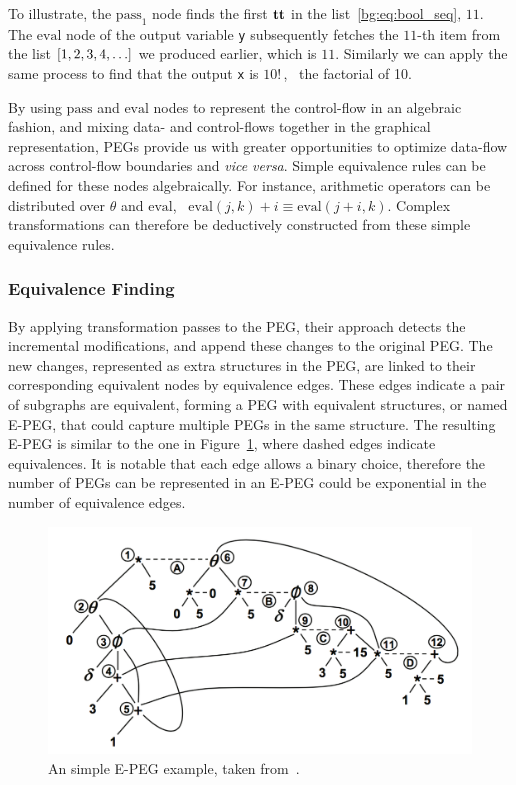 To illustrate, the $\mathrm{pass}_1$ node finds the first $\mathbf{tt}$ in the
list~\eqref{bg:eq:bool_seq}, $11$.  The $\mathrm{eval}$ node of the output
variable \verb|y| subsequently fetches the $11$-th item from the list $[1, 2,
3, 4, \mathellipsis]$ we produced earlier, which is $11$.  Similarly we can
apply the same process to find that the output \verb|x| is $10!\,$, \ie~the
factorial of 10.

By using $\mathrm{pass}$ and $\mathrm{eval}$ nodes to represent the
control-flow in an algebraic fashion, and mixing data- and control-flows
together in the graphical representation, PEGs provide us with greater
opportunities to optimize data-flow across control-flow boundaries and
\emph{vice versa}.  Simple equivalence rules can be defined for these nodes
algebraically.  For instance, arithmetic operators can be distributed
over $\theta$ and $\mathrm{eval}$, \eg~$\mathrm{eval}(j, k) + i \equiv
\mathrm{eval}(j + i, k)$.  Complex transformations can therefore be deductively
constructed from these simple equivalence rules.

\subsubsection{Equivalence Finding}

By applying transformation passes to the PEG, their approach detects the
incremental modifications, and append these changes to the original PEG\@.  The
new changes, represented as extra structures in the PEG, are linked to their
corresponding equivalent nodes by equivalence edges.  These edges indicate a
pair of subgraphs are equivalent, forming a PEG with equivalent structures,
or named E-PEG, that could capture multiple PEGs in the same structure.  The
resulting E-PEG is similar to the one in Figure~\ref{bg:fig:epeg}, where dashed
edges indicate equivalences.  It is notable that each edge allows a binary
choice, therefore the number of PEGs can be represented in an E-PEG could be
exponential in the number of equivalence edges.
\begin{figure}[ht]
    \centering
    \includegraphics[width=0.8\linewidth]{bg/fig/epeg.png}
    \caption{An simple E-PEG example, taken from~\cite{tate09}.
    }\label{bg:fig:epeg}
\end{figure}

